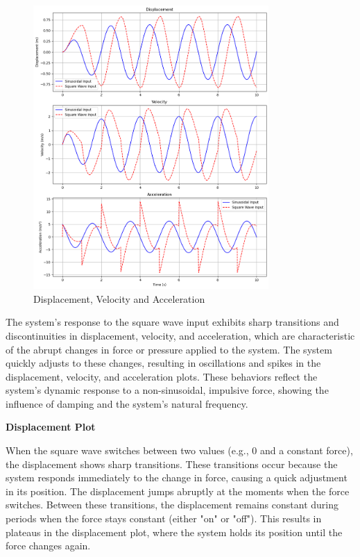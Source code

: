 \documentclass[12pt,a4paper]{article}
\begin{document}
\begin{figure}[H]
    \centering
    \includegraphics[width=0.8\textwidth]{disp_vel_acc.png  } 
    \caption{Displacement, Velocity and Acceleration }
    \label{fig:system}
\end{figure}
{\vspace{10pt}}

The system’s response to the square wave input exhibits sharp transitions and discontinuities in displacement, velocity, and acceleration, which are characteristic of the abrupt changes in force or pressure applied to the system. The system quickly adjusts to these changes, resulting in oscillations and spikes in the displacement, velocity, and acceleration plots. These behaviors reflect the system's dynamic response to a non-sinusoidal, impulsive force, showing the influence of damping and the system’s natural frequency.
\vspace{5pt}

\noindent\textbf{Displacement Plot }  

When the square wave switches between two values (e.g., 0 and a constant force), the displacement shows sharp transitions. These transitions occur because the system responds immediately to the change in force, causing a quick adjustment in its position. The displacement jumps abruptly at the moments when the force switches. Between these transitions, the displacement remains constant during periods when the force stays constant (either "on" or "off"). This results in plateaus in the displacement plot, where the system holds its position until the force changes again.  
\vspace{5pt}  
\end{document}
